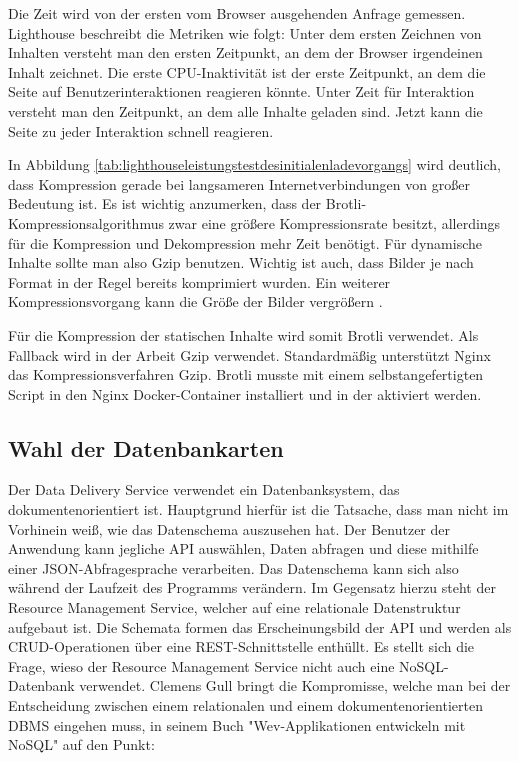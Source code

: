 Die Zeit wird von der ersten vom Browser ausgehenden Anfrage gemessen.
Lighthouse beschreibt die Metriken wie folgt: Unter dem ersten Zeichnen
von Inhalten versteht man den ersten Zeitpunkt, an dem der Browser
irgendeinen Inhalt zeichnet. Die erste CPU-Inaktivität ist
der erste Zeitpunkt, an dem die Seite auf Benutzerinteraktionen reagieren könnte.
Unter Zeit für Interaktion versteht man den Zeitpunkt, an dem alle Inhalte geladen sind.
Jetzt kann die Seite zu jeder Interaktion schnell reagieren.\cite{WhatPerformanceMetricsMeasure}

In Abbildung \ref{tab:lighthouseleistungstestdesinitialenladevorgangs} wird deutlich,
dass Kompression gerade bei langsameren Internetverbindungen von großer Bedeutung ist.
Es ist wichtig anzumerken, dass der Brotli-Kompressionsalgorithmus zwar eine größere
Kompressionsrate besitzt, allerdings für die Kompression und Dekompression mehr Zeit
benötigt.\cite{CompressionBenchmark} Für dynamische Inhalte sollte man also Gzip
benutzen. Wichtig ist auch, dass Bilder je nach Format in der Regel bereits komprimiert wurden.
Ein weiterer Kompressionsvorgang kann die Größe der Bilder vergrößern \cite{CloudFlareCompressionDiscussion}.

Für die Kompression der statischen Inhalte wird somit Brotli verwendet.
Als Fallback wird in der Arbeit Gzip verwendet. Standardmäßig unterstützt Nginx
das Kompressionsverfahren Gzip. Brotli musste mit einem selbstangefertigten Script in
den Nginx Docker-Container installiert und in der  aktiviert werden.

\subsection{Wahl der Datenbankarten}
\label{subsec:wahlderdatenbankarten}
Der Data Delivery Service verwendet ein Datenbanksystem, das dokumentenorientiert ist.
Hauptgrund hierfür ist die Tatsache, dass man nicht im Vorhinein weiß, wie das
Datenschema auszusehen hat. Der Benutzer der Anwendung kann jegliche API
auswählen, Daten abfragen und diese mithilfe einer JSON-Abfragesprache verarbeiten. Das Datenschema
kann sich also während der Laufzeit des Programms verändern. Im Gegensatz hierzu steht der Resource
Management Service, welcher auf eine relationale Datenstruktur aufgebaut ist. Die Schemata formen das
Erscheinungsbild der API und werden als CRUD-Operationen über eine REST-Schnittstelle enthüllt.
Es stellt sich die Frage, wieso der Resource Management Service nicht auch eine NoSQL-Datenbank verwendet.
Clemens Gull bringt die Kompromisse, welche man bei der Entscheidung zwischen einem relationalen
und einem dokumentenorientierten DBMS eingehen muss, in seinem Buch "Wev-Applikationen
entwickeln mit NoSQL" auf den Punkt:

